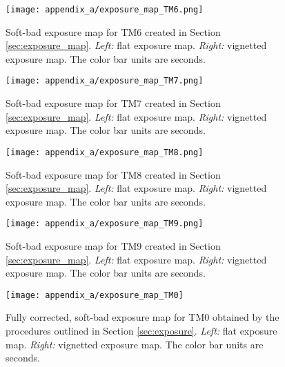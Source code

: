 \begin{figure}[htbp]
    \centering
    \texttt{[image: appendix\_a/exposure\_map\_TM6.png]}
    \caption[Exposure maps for TM6.]{Soft-bad exposure map for TM6 created in Section \ref{sec:exposure_map}. \textit{Left:} flat exposure map. \textit{Right:} vignetted exposure map. The color bar units are seconds.}
    \label{fig:TM6}
\end{figure}

\begin{figure}[htbp]
    \centering
    \texttt{[image: appendix\_a/exposure\_map\_TM7.png]}
    \caption[Exposure maps for TM7.]{Soft-bad exposure map for TM7 created in Section \ref{sec:exposure_map}. \textit{Left:} flat exposure map. \textit{Right:} vignetted exposure map. The color bar units are seconds.}
    \label{fig:TM7}
\end{figure}

\begin{figure}[htbp]
    \centering
    \texttt{[image: appendix\_a/exposure\_map\_TM8.png]}
    \caption[Exposure maps for TM8.]{Soft-bad exposure map for TM8 created in Section \ref{sec:exposure_map}. \textit{Left:} flat exposure map. \textit{Right:} vignetted exposure map. The color bar units are seconds.}
    \label{fig:TM8}
\end{figure}

\begin{figure}[htbp]
    \centering
    \texttt{[image: appendix\_a/exposure\_map\_TM9.png]}
    \caption[Exposure maps for TM9.]{Soft-bad exposure map for TM9 created in Section \ref{sec:exposure_map}. \textit{Left:} flat exposure map. \textit{Right:} vignetted exposure map. The color bar units are seconds.}
    \label{fig:TM9}
\end{figure}
%
\begin{figure}[htbp]
    \centering
    \texttt{[image: appendix\_a/exposure\_map\_TM0]}
    \caption[Exposure maps for TM0.]{Fully corrected, soft-bad exposure map for TM0 obtained by the procedures outlined in Section \ref{sec:exposure}. \textit{Left:} flat exposure map. \textit{Right:} vignetted exposure map. The color bar units are seconds.}
    \label{fig:TM0}
\end{figure}
%
\clearpage
